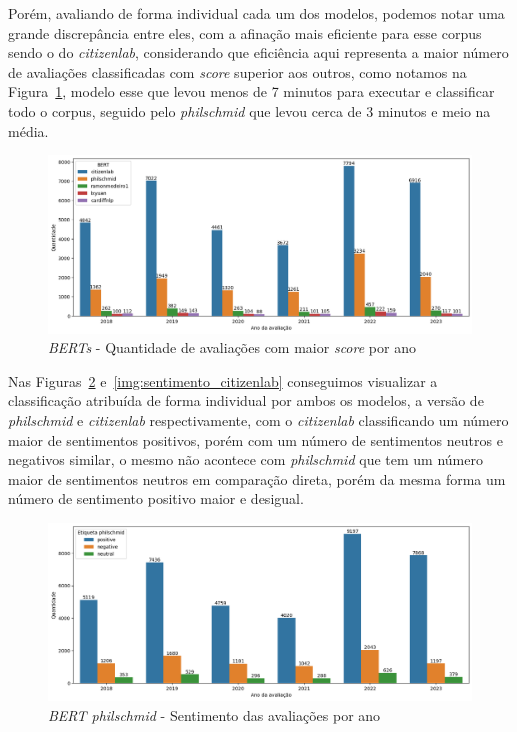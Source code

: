 Porém, avaliando de forma individual cada um dos modelos, podemos notar uma grande discrepância entre eles, com a afinação mais eficiente para esse corpus sendo o do \textit{citizenlab}, considerando que eficiência aqui representa a maior número de avaliações classificadas com \textit{score} superior aos outros, como notamos na Figura~\ref{img:rinha_de_berts}, modelo esse que levou menos de 7 minutos para executar e classificar todo o corpus, seguido pelo \textit{philschmid} que levou cerca de 3 minutos e meio na média.

\begin{figure}
	\centering
	\includegraphics[width=1\textwidth]{figs/bert/desempenho_berts.png}
	\caption{\textit{BERTs} - Quantidade de avaliações com maior \textit{score} por ano}
	\label{img:rinha_de_berts}
\end{figure}

Nas Figuras~\ref{img:sentimento_phil} e~\ref{img:sentimento_citizenlab} conseguimos visualizar a classificação atribuída de forma individual por ambos os modelos, a versão de \textit{philschmid} e \textit{citizenlab} respectivamente, com o \textit{citizenlab} classificando um número maior de sentimentos positivos, porém com um número de sentimentos neutros e negativos similar, o mesmo não acontece com \textit{philschmid} que tem um número maior de sentimentos neutros em comparação direta, porém da mesma forma um número de sentimento positivo maior e desigual.

\begin{figure}
	\centering
	\centering
	\includegraphics[width=1\textwidth]{figs/bert/classificacao_phil.png}
	\caption{\textit{BERT philschmid} - Sentimento das avaliações por ano}
	\label{img:sentimento_phil}
\end{figure}

